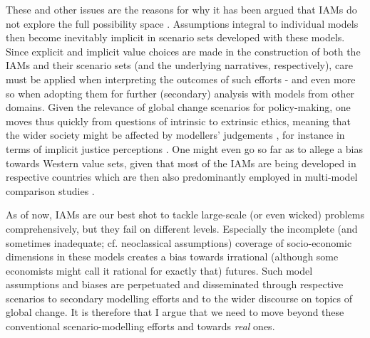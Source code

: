 \documentclass{article}
\begin{document}
\begin{refsection}


These and other issues are the reasons for why it has been argued that IAMs do not explore the full possibility space \parencite{keppo_2021,mccollum_2020, gambhir_2022}. Assumptions integral to individual models then become inevitably implicit in scenario sets developed with these models. Since explicit and implicit value choices are made in the construction of both the IAMs and their scenario sets (and the underlying narratives, respectively), care must be applied when interpreting the outcomes of such efforts \parencite[even if it is only reference scenarios; see e.g.][]{grant_2020} - and even more so when adopting them for further (secondary) analysis with models from other domains. Given the relevance of global change scenarios for policy-making, one moves thus quickly from questions of intrinsic to extrinsic ethics, meaning that the wider society might be affected by modellers' judgements \parencite{beck_2016},\footnotemark{} for instance in terms of implicit justice perceptions \parencite{rubiano_2022}. One might even go so far as to allege a bias towards Western value sets, given that most of the IAMs are being developed in respective countries which are then also predominantly employed in multi-model comparison studies \parencite{duan_2019}.


As of now, IAMs are our best shot to tackle large-scale (or even wicked) problems comprehensively, but they fail on different levels. Especially the incomplete (and sometimes inadequate; cf. neoclassical assumptions) coverage of socio-economic dimensions in these models creates a bias towards irrational (although some economists might call it rational for exactly that) futures. Such model assumptions and biases are perpetuated and disseminated through respective scenarios to secondary modelling efforts and to the wider discourse on topics of global change. It is therefore that I argue that we need to move beyond these conventional scenario-modelling efforts and towards \textit{real} ones.


\end{refsection}
\end{document}
